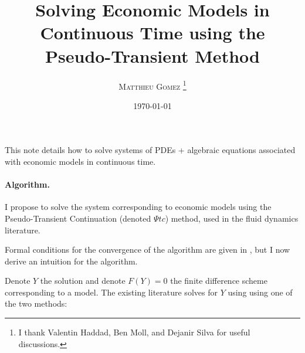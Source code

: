 \documentclass[english]{article}
\begin{document}
	\title{Solving Economic Models in Continuous Time using the Pseudo-Transient Method}
	\author{\large{\textsc{Matthieu Gomez \thanks{I thank Valentin Haddad, Ben Moll, and Dejanir Silva for useful discussions.}}}}
	\date{\today}
	\maketitle
	This note details how to solve systems of PDEs + algebraic equations associated with economic models in continuous time.

	\paragraph{Algorithm.}
	I propose to solve the system corresponding to economic models using the Pseudo-Transient Continuation (denoted $\Psi tc$) method, used in the fluid dynamics literature. 
	\par Formal conditions for the convergence of the algorithm are given in  \citet{kelley1998convergence}, but I now derive an intuition for the algorithm.\par
	Denote $Y$  the solution and denote $F(Y) = 0$ the finite difference scheme corresponding to a model. The existing literature solves for $Y$ using using one of the two methods:
\end{document}
